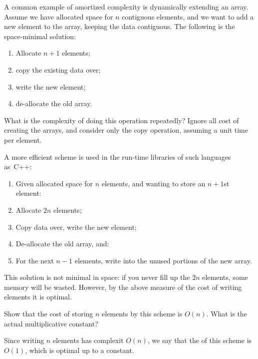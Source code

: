 A common example of amortized complexity is dynamically extending an array.
Assume we have allocated space for $n$ contiguous elements,
and we want to add a new element to the array,
keeping the data contiguous.
The following is the space-minimal solution: 
\begin{enumerate}
\item Allocate $n+1$ elements;
\item copy the existing data over;
\item write the new element;
\item de-allocate the old array.
\end{enumerate}

\begin{exercise}
  What is the complexity of doing this operation repeatedly?
  Ignore all cost of creating the arrays, and consider
  only the copy operation, assuming a unit time per element.
\end{exercise}

A more efficient scheme is used in the run-time libraries
of such languages as~C++:
\begin{enumerate}
\item Given allocated space for $n$ elements,
  and wanting to store an $n+1$st element:
\item Allocate $2n$ elements;
\item Copy data over, write the new element;
\item De-allocate the old array, and:
\item For the next $n-1$ elements, write into the unused
  portions of the new array.
\end{enumerate}

This solution is not minimal in space:
if you never fill up the $2n$ elements,
some memory will be wasted.
However, by the above measure of the cost of writing elements
it is optimal.

\begin{exercise}
  Show that the cost of storing $n$ elements by this scheme
  is $O(n)$. What is the actual multiplicative constant?
\end{exercise}

Since writing $n$ elements has complexit $O(n)$,
we say that the 
of this scheme is~$O(1)$, which is optimal up to a constant.

